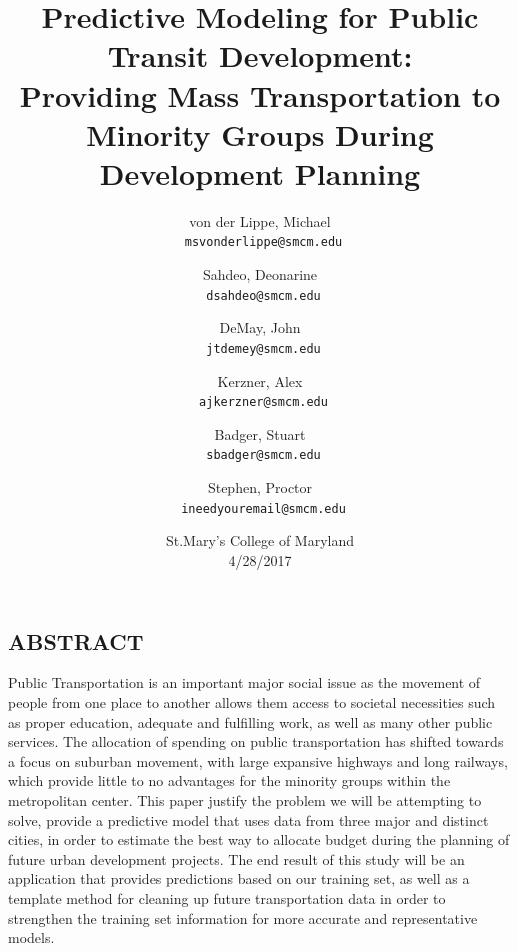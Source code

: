\documentclass[12pt]{article}
\title{\textbf{Predictive Modeling for Public Transit Development:}\\Providing Mass Transportation to Minority Groups During Development Planning}
\author{
	von der Lippe, Michael \\ \		\texttt{msvonderlippe@smcm.edu}
	\and
	Sahdeo, Deonarine\\ \		\texttt{dsahdeo@smcm.edu}
	\and
	DeMay, John \\ \		\texttt{jtdemey@smcm.edu}
	\and
	Kerzner, Alex\\ \		\texttt{ajkerzner@smcm.edu}
	\and
	Badger, Stuart\\ \		\texttt{sbadger@smcm.edu}
	\and
	Stephen, Proctor\\ \		\texttt{ineedyouremail@smcm.edu}
	}
\date{St.Mary's College of Maryland\\4/28/2017}
\begin{document}
	\maketitle

\begin{multicols}{2}

\section{ABSTRACT}
Public Transportation is an important major social issue as the movement of people from one place to another allows them access to societal necessities such as proper education, adequate and fulfilling work, as well as many other public services. The allocation of spending on public transportation has shifted towards a focus on suburban movement, with large expansive highways and long railways, which provide little to no advantages for the minority groups within the metropolitan center. This paper justify the problem we will be attempting to solve, provide a predictive model that uses data from three major and distinct cities, in order to estimate the best way to allocate budget during the planning of future urban development projects. The end result of this study will be an application that provides predictions based on our training set, as well as a template method for cleaning up future transportation data in order to strengthen the training set information for more accurate and representative models. 


\end{multicols}
\end{document}
